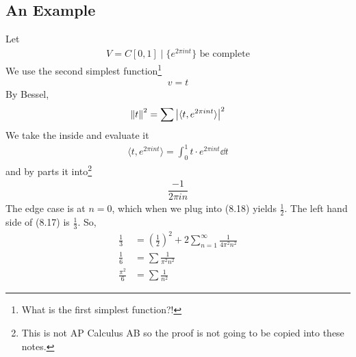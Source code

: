 \subsection{An Example}
Let
\begin{align}
    V = C[0,1] \mid \{ e^{2\pi int} \} \text{ be complete}
\end{align}
We use the second simplest function\footnote{What is the first simplest function?!}
\begin{align}
    v = t
\end{align}
By Bessel,
\begin{align}
    \norm{t}^2 = \sum \abs{\langle t, e^{2\pi int} \rangle}^2
\end{align}
We take the inside and evaluate it
\begin{align}
    \langle t, e^{2\pi int} \rangle = \int_0^1 t \cdot e^{2\pi int} \dd{t}
\end{align}
and by parts it into\footnote{This is not AP Calculus AB so the proof is not going to be copied into these notes.}
\begin{align}
    \dfrac{-1}{2\pi in}
\end{align}
The edge case is at $n=0$, which when we plug into (8.18) yields $\frac{1}{2}$. The left hand side of (8.17) is $\frac{1}{3}$. So,
\begin{align}
    \frac{1}{3} &= (\frac{1}{2})^2 + 2\sum_{n=1}^\infty \frac{1}{4\pi^2 n^2}\\
    \frac{1}{6} &= \sum \frac{1}{\pi^2 n^2}\\
    \frac{\pi^2}{6} &= \sum \frac{1}{n^2}
\end{align}